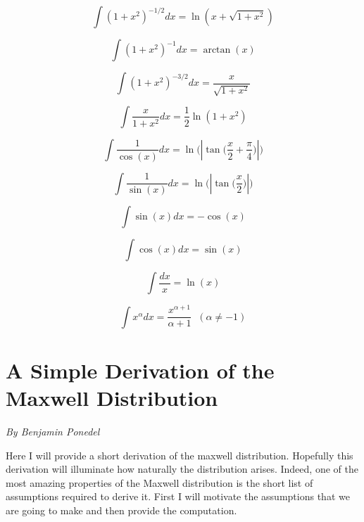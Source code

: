 \documentclass[12pt]{book}
\begin{document}
\begin{multicols}{2}
\begin{equation*}
 \int (1+x^2)^{-1/2} dx = \ln(x+\sqrt{1+x^2})
\end{equation*}

\begin{equation*}
 \int (1+x^2)^{-1} dx = \arctan(x)
\end{equation*}

\begin{equation*}
 \int (1+x^2)^{-3/2} dx = \frac{x}{\sqrt{1+x^2}}
\end{equation*}

\begin{equation*}
 \int \frac{x}{1+x^2} dx = \frac{1}{2}\ln(1+x^2)
\end{equation*}

\begin{equation*}
 \int \frac{1}{\cos(x)} dx = \ln\bigg(\left|\tan\bigg(\frac{x}{2}+\frac{\pi}{4}\bigg)\right|\bigg) 
\end{equation*}

\begin{equation*}
 \int \frac{1}{\sin(x)} dx = \ln\bigg(\left|\tan\bigg(\frac{x}{2}\bigg)\right|\bigg) 
\end{equation*}

\begin{equation*}
 \int \sin(x) dx = -\cos(x)
\end{equation*}

\begin{equation*}
 \int \cos(x) dx = \sin(x)
\end{equation*}

\begin{equation*}
 \int \frac{dx}{x} = \ln(x)
\end{equation*}

\begin{equation*}
 \int x^\alpha dx = \frac{x^{\alpha+1}}{\alpha+1} \;\; (\alpha\neq -1)
\end{equation*}

\end{multicols}

\chapter{A Simple Derivation of the Maxwell Distribution}

{\it By Benjamin Ponedel}

Here I will provide a short derivation of the maxwell distribution. Hopefully this derivation will illuminate
how naturally the distribution arises. Indeed, one of the most amazing properties of the Maxwell distribution
is the short list of assumptions required to derive it. First I will motivate the assumptions that we are going
to make and then provide the computation.
\end{document}
